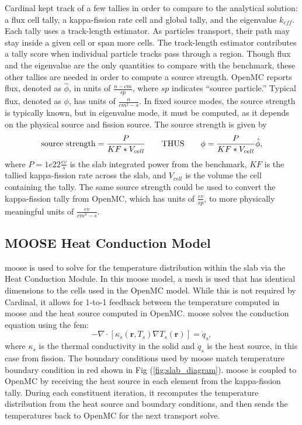 \documentclass[letterpaper]{mc2023}
\begin{document}
Cardinal kept track of a few tallies in order to compare to the analytical solution: a flux cell tally, a kappa-fission rate cell and global
tally, and the eigenvalue $k_{eff}$. Each tally uses a track-length estimator. As particles transport, their path may stay inside a given cell
or span more cells. The track-length estimator contributes a tally score when individual particle tracks pass through a region. Though
flux and the eigenvalue are the only quantities to compare with the benchmark, these other tallies are needed in order to compute a
source strength. OpenMC reports flux, denoted as $\hat{\phi}$, in units of $\frac{n-cm}{sp}$, where $sp$ indicates ``source particle.''
Typical flux, denoted as $\phi$, has units of $\frac{n}{cm^2-s}$. In fixed source modes, the source strength is typically known, but in
eigenvalue mode, it must be computed, as it depends on the physical source and fission source. The source strength is given by
\begin{equation} \label{eq:source_strength}
   \text{source strength} = \frac{P}{KF*V_{cell}} \qquad \text{THUS} \qquad \phi = \frac{P}{KF*V_{cell} }\hat{\phi},
\end{equation}
where $P=1e22 \frac{ev}{s}$ is the slab integrated power from the benchmark, $KF$ is the tallied kappa-fission rate across the slab,
and $V_{cell}$ is the volume the cell containing the tally. The same source strength could be used to convert the kappa-fission tally from
OpenMC, which has units of $\frac{ev}{sp}$, to more physically meaningful units of $\frac{ev}{cm^3-s}$.

\subsection{MOOSE Heat Conduction Model}
\gls{moose} is used to solve for the temperature distribution within the slab via the Heat Conduction Module. In this \gls{moose}
model, a mesh is used that has identical dimensions to the cells used in the OpenMC model. While this is not required by Cardinal,
it allows for 1-to-1 feedback between the temperature computed in \gls{moose} and the heat source computed in OpenMC. \gls{moose}
solves the conduction equation using the \gls{fem}:
\begin{equation}\label{eq:conduction}
    - \nabla \cdot [\kappa_{s}(\mathbf{r},T_{s}) \nabla T_{s}(\mathbf{r})] = \dot{q}_{s},
\end{equation}
where $\kappa_{s}$ is the thermal conductivity in the solid and $\dot{q}_{s}$ is the heat source, in this case from fission. The
boundary conditions used by \gls{moose} match temperature boundary condition in red shown in Fig (\ref{fig:slab_diagram}). \gls{moose}
is coupled to OpenMC by receiving the heat source in each element from the kappa-fission tally. During each constituent iteration,
it recomputes the temperature distribution from the heat source and boundary conditions, and then sends the temperatures back to
OpenMC for the next transport solve.
\end{document}
